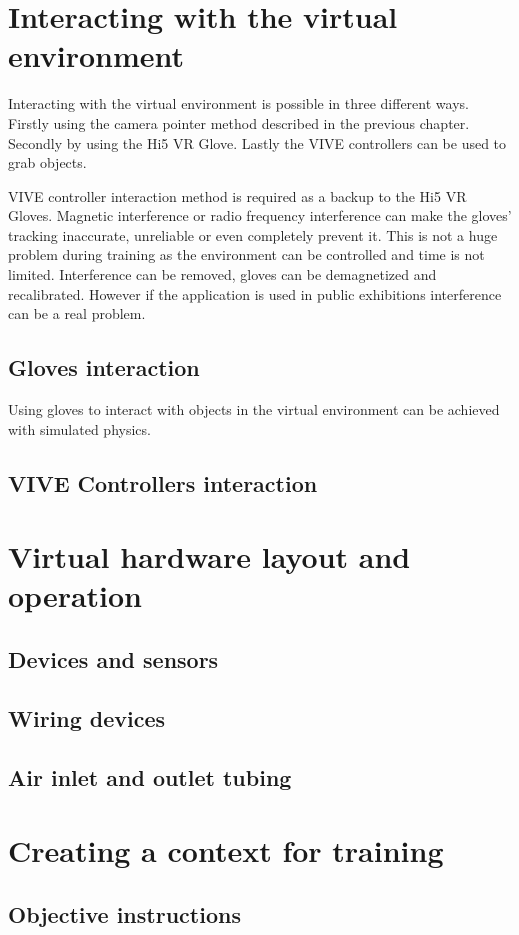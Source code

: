 \documentclass[12pt, a4paper,oneside, nocenter]{thesis}
\begin{document}
\section{Interacting with the virtual environment}
Interacting with the virtual environment is possible in three different ways. Firstly using the camera pointer method described in the previous chapter. Secondly by using the Hi5 VR Glove. Lastly the VIVE controllers can be used to grab objects.
\par
VIVE controller interaction method is required as a backup to the Hi5 VR Gloves. Magnetic interference or radio frequency interference can make the gloves' tracking inaccurate, unreliable or even completely prevent it. This is not a huge problem during training as the environment can be controlled and time is not limited. Interference can be removed, gloves can be demagnetized and recalibrated. However if the application is used in public exhibitions interference can be a real problem.
\subsection{Gloves interaction}
Using gloves to interact with objects in the virtual environment can be achieved with simulated physics.
\subsection{VIVE Controllers interaction}
\section{Virtual hardware layout and operation}
\subsection{Devices and sensors}
\subsection{Wiring devices}
\subsection{Air inlet and outlet tubing}
\section{Creating a context for training}
\subsection{Objective instructions}
\end{document}
